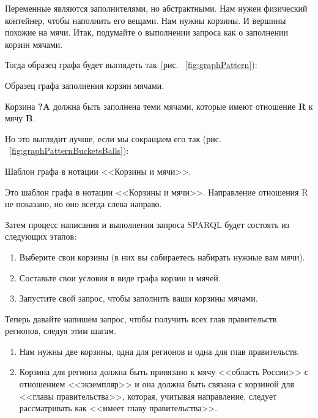 Переменные являются заполнителями, но абстрактными. Нам нужен физический контейнер, чтобы наполнить его вещами. Нам нужны корзины. И вершины похожие на мячи. Итак, подумайте о выполнении запроса как о заполнении корзин мячами.

Тогда образец графа будет выглядеть так (рис. ~\ref{fig:graphPattern}):

\begin{marginfigure}[-1.5cm]
	{
		\setlength{\fboxsep}{0pt}%
		\setlength{\fboxrule}{1pt}%
	}
    \caption{Образец графа заполнения корзин мячами.}
	\label{fig:graphPattern}
\end{marginfigure}

Корзина \textbf{?A} должна быть заполнена теми мячами, которые имеют отношение \textbf{R} к мячу \textbf{B}.

Но это выглядит лучше, если мы сокращаем его так (рис. ~\ref{fig:graphPatternBucketsBalls}): 

\begin{marginfigure}[1.0cm]
	{
		\setlength{\fboxsep}{0pt}%
		\setlength{\fboxrule}{1pt}%
	}
    \caption{Шаблон графа в нотации <<Корзины и мячи>>.}
	\label{fig:graphPatternBucketsBalls}
\end{marginfigure}

Это шаблон графа в нотации <<Корзины и мячи>>. Направление отношения R не показано, но оно всегда слева направо.

Затем процесс написания и выполнения запроса SPARQL будет состоять из следующих этапов:
\begin{enumerate}
    \item Выберите свои корзины (в них вы собираетесь набирать нужные вам мячи).
    \item Составьте свои условия в виде графа корзин и мячей.
    \item Запустите свой запрос, чтобы заполнить ваши корзины мячами.
\end{enumerate}

Теперь давайте напишем запрос, чтобы получить всех глав правительств регионов, следуя этим шагам.

\begin{enumerate}
    \item Нам нужны две корзины, одна для регионов и одна для глав правительств.
    \item Корзина для региона должна быть привязано к мячу <<область России>> с отношением <<экземпляр>> и она должна быть связана с корзиной для <<главы правительства>>, которая, учитывая направление, следует рассматривать как <<имеет главу правительства>>. 
\end{enumerate}

